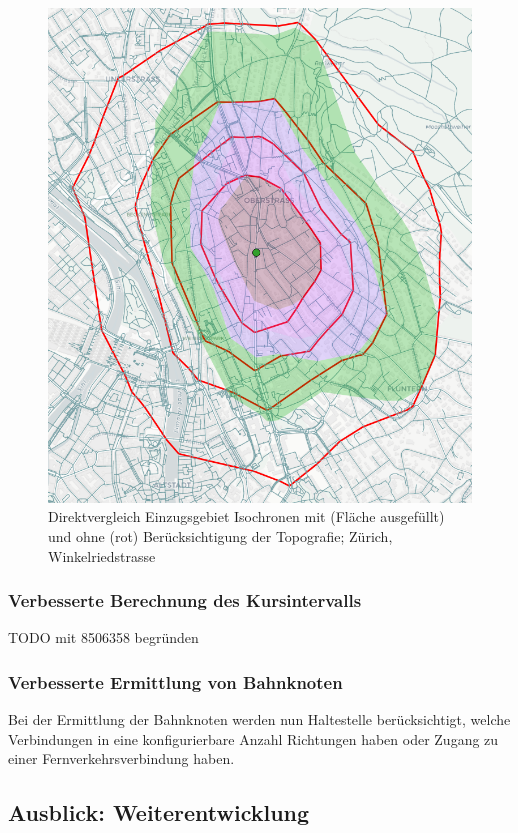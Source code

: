 \begin{figure}[ht]
    \centering
    \includegraphics[width=0.8\linewidth]{technicalreport/img/vergleich_wegfuehrung_isochrone_mit_ohne_topo.png}
    \caption[Direktvergleich Einzugsgebiet Isochronen mit und ohne Topografie]{Direktvergleich Einzugsgebiet Isochronen mit (Fläche ausgefüllt) und ohne (rot) Berücksichtigung der Topografie; Zürich, Winkelriedstrasse}
    \label{fig:vergleich_wegfuehrung_isochrone_mit_ohne_topo}
\end{figure}


\subsubsection{Verbesserte Berechnung des Kursintervalls}

TODO mit 8506358 begründen

\subsubsection{Verbesserte Ermittlung von Bahnknoten}
Bei der Ermittlung der Bahnknoten werden nun Haltestelle berücksichtigt, welche Verbindungen in eine konfigurierbare Anzahl Richtungen haben oder Zugang zu einer Fernverkehrsverbindung haben.


\subsection{Ausblick: Weiterentwicklung}
\label{Resultate:Ausblick: Weiterentwicklung}

